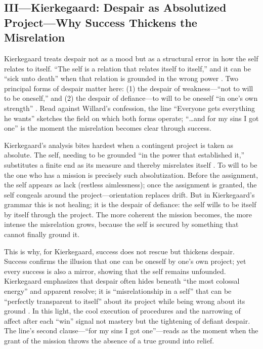 \subsection*{III—Kierkegaard: Despair as Absolutized Project—Why Success Thickens the
	Misrelation}
\label{ssec:iii-kierkegaard}
Kierkegaard treats despair not as a mood but as a structural error in how the self relates to
itself. ``The self is a relation that relates itself to itself,'' and it can be ``sick unto
death'' when that relation is grounded in the wrong power
\parencite[pp.~49--52]{KierkegaardSUD1980}.
Two principal forms of despair matter here: (1) the despair of weakness—``not to will to be
oneself,'' and (2) the despair of defiance—to will to be oneself ``in one's own strength''
\parencite[pp.~52--61, 69--73]{KierkegaardSUD1980}. Read against Willard's confession, the line
``Everyone gets everything he wants'' sketches the field on which both forms operate;
``\ldots and for my sins I got one'' is the moment the misrelation becomes clear through
success.

Kierkegaard's analysis bites hardest when a contingent project is taken as absolute. The self,
needing to be grounded ``in the power that established it,'' substitutes a finite end as its
measure and thereby misrelates itself \parencite[pp.~79--83]{KierkegaardSUD1980}. To will to be
the one who has a mission is precisely such absolutization. Before the assignment, the self
appears as lack (restless aimlessness); once the assignment is granted, the self congeals around
the project—orientation replaces drift. But in Kierkegaard's grammar this is not healing; it is
the despair of defiance: the self wills to be itself by itself through the project. The more
coherent the mission becomes, the more intense the misrelation grows, because the self is
secured by something that cannot finally ground it.

This is why, for Kierkegaard, success does not rescue but thickens despair. Success confirms
the illusion that one can be oneself by one's own project; yet every success is also a mirror,
showing that the self remains unfounded. Kierkegaard emphasizes that despair often hides beneath
``the most colossal energy'' and apparent resolve; it is ``misrelationship in a self'' that can
be ``perfectly transparent to itself'' about its project while being wrong about its ground
\parencite[pp.~72--76]{KierkegaardSUD1980}. In this light, the cool execution of procedures and
the narrowing of affect after each ``win'' signal not mastery but the tightening of defiant
despair. The line's second clause—``for my sins I got one''—reads as the moment when the grant
of the mission throws the absence of a true ground into relief.

